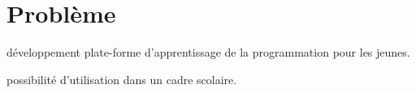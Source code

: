 \section{Problème}
développement plate-forme d'apprentissage de la programmation pour les jeunes.

possibilité d'utilisation dans un cadre scolaire.

